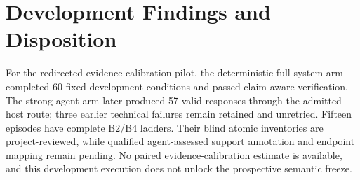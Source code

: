 \documentclass[conference]{IEEEtran}
\begin{document}
\section{Development Findings and Disposition}

For the redirected evidence-calibration pilot, the deterministic full-system arm completed 60
fixed development conditions and passed claim-aware verification. The strong-agent arm later
produced 57 valid responses through the admitted host route; three earlier technical failures
remain retained and unretried. Fifteen episodes have complete B2/B4 ladders. Their blind atomic
inventories are project-reviewed, while qualified agent-assessed support annotation and endpoint
mapping remain pending. No paired evidence-calibration estimate is available, and this development
execution does not unlock the prospective semantic freeze.
\end{document}
